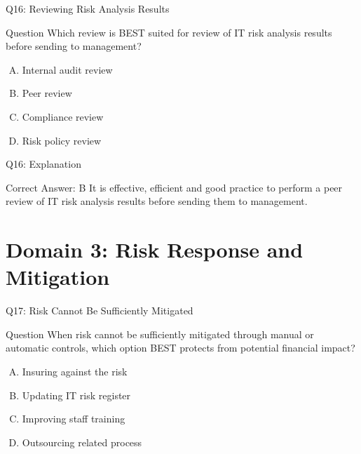 \documentclass{beamer}
\begin{document}
	
		\begin{frame}[shrink=10]{Q16: Reviewing Risk Analysis Results}
		\begin{block}{Question}
			Which review is BEST suited for review of IT risk analysis results before sending to management?
		\end{block}
		\begin{enumerate}[(A)]
			\item Internal audit review
			\item Peer review
			\item Compliance review
			\item Risk policy review
		\end{enumerate}
	\end{frame}
	
	\begin{frame}{Q16: Explanation}
		\begin{block}{Correct Answer: B}
			It is effective, efficient and good practice to perform a peer review of IT risk analysis results before sending them to management.
		\end{block}

	\end{frame}
	
	
	
	\section{Domain 3: Risk Response and Mitigation}
	
	\begin{frame}{Q17: Risk Cannot Be Sufficiently Mitigated}
		\begin{block}{Question}
			When risk cannot be sufficiently mitigated through manual or automatic controls, which option BEST protects from potential financial impact?
		\end{block}
		\begin{enumerate}[(A)]
			\item Insuring against the risk
			\item Updating IT risk register
			\item Improving staff training
			\item Outsourcing related process
		\end{enumerate}
	\end{frame}
	
\end{document}
